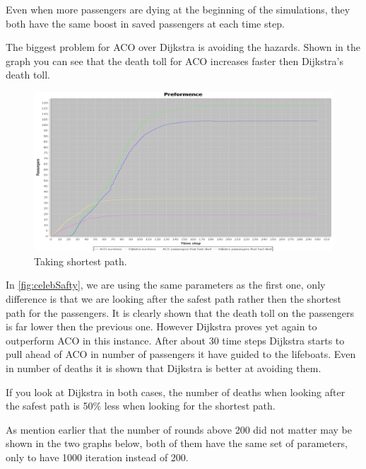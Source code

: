 Even when more passengers are dying at the beginning of the simulations, they both have the same boost in saved passengers at each time step.

The biggest problem for ACO over Dijkstra is avoiding the hazards. Shown in the graph you can see that the death toll for ACO increases faster then Dijkstra's death toll.

\begin{figure} [h]
\centering
\hspace*{-1.0in}
\includegraphics[scale=0.35]{images/Graph-using-200-rounds-140-passangers-and-shortest-first-one-hazzard.png}
\caption{Taking shortest path.}
\label{fig:celebShortest}
\end{figure}

In \ref{fig:celebSafty}, we are using the same parameters as the first one, only difference is that we are looking after the safest path rather then the shortest path for the passengers. It is clearly shown that the death toll on the passengers is far lower then the previous one.
However Dijkstra proves yet again to outperform ACO in this instance. After about 30 time steps Dijkstra starts to pull ahead of ACO in number of passengers it have guided to the lifeboats. Even in number of deaths it is shown that Dijkstra is better at avoiding them.

If you look at Dijkstra in both cases, the number of deaths when looking after the safest path is 50\% less when looking for the shortest path.

As mention earlier that the number of rounds above 200 did not matter may be shown in the two graphs below, both of them have the same set of parameters, only to have 1000 iteration instead of 200.

